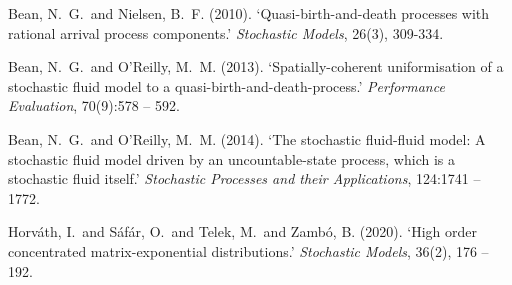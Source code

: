 \documentclass[a4paper]{article}
\begin{document}
\begin{thebibliography}{9}
    Bean, N.~G.~and Nielsen, B.~F. (2010). {`Quasi-birth-and-death processes with rational arrival process components.}' \textit{Stochastic Models}, 26(3), 309-334.

    Bean, N.~G.~and O'Reilly, M.~M. (2013). {`Spatially-coherent uniformisation of a stochastic fluid model to a quasi-birth-and-death-process.'} \textit{Performance Evaluation}, 70(9):578 -- 592.

    Bean, N.~G.~and O'Reilly, M.~M. (2014). {`The stochastic fluid-fluid model: A stochastic fluid model driven by an uncountable-state process, which is a stochastic fluid itself.'} \textit{Stochastic Processes and their Applications}, 124:1741 -- 1772.

    Horv\'ath, I.~and S\'af\'ar, O.~and Telek, M.~and Zamb\'o, B. (2020). `{High order concentrated matrix-exponential distributions.}' \textit{Stochastic Models}, 36(2), 176 -- 192.
\end{thebibliography}
\end{document}
